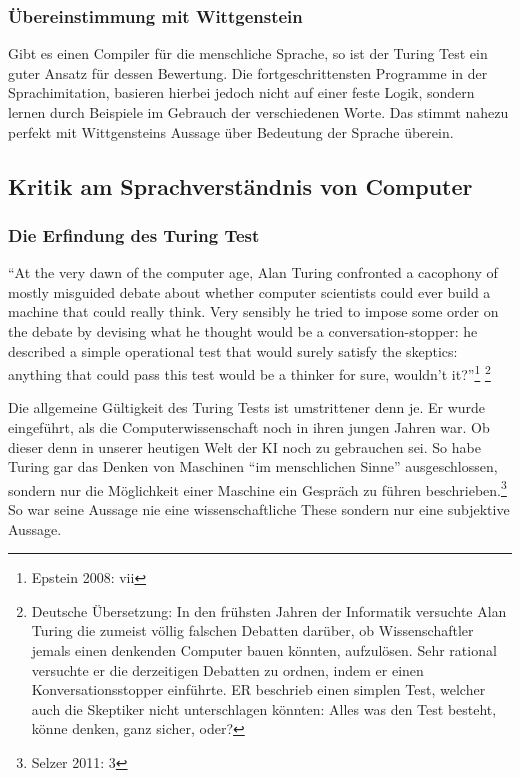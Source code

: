 \documentclass[10pt,a4paper]{article}
\begin{document}
\subsubsection{Übereinstimmung mit Wittgenstein}
Gibt es einen Compiler für die menschliche Sprache, so ist der Turing Test ein guter Ansatz für dessen Bewertung. Die fortgeschrittensten Programme in der Sprachimitation, basieren hierbei jedoch nicht auf einer feste Logik, sondern lernen durch Beispiele im Gebrauch der verschiedenen Worte. Das stimmt nahezu perfekt mit Wittgensteins Aussage über Bedeutung der Sprache überein.

\subsection{Kritik am Sprachverständnis von Computer}
\subsubsection{Die Erfindung des Turing Test}
\begin{displayquote}
\enquote{At the very dawn of the computer age, Alan Turing confronted a cacophony of
mostly misguided debate about whether computer scientists could ever build a
machine that could really think. Very sensibly he tried to impose some order on the
debate by devising what he thought would be a conversation-stopper: he described
a simple operational test that would surely satisfy the skeptics: anything that could
pass this test would be a thinker for sure, wouldn’t it?}\footnote{Epstein 2008: vii} \footnote{Deutsche Übersetzung: In den frühsten Jahren der Informatik versuchte Alan Turing die zumeist völlig falschen Debatten darüber, ob Wissenschaftler jemals einen denkenden Computer bauen könnten, aufzulösen. Sehr rational versuchte er die derzeitigen Debatten zu ordnen, indem er einen Konversationsstopper einführte. ER beschrieb einen simplen Test, welcher auch die Skeptiker nicht unterschlagen könnten: Alles was den Test besteht, könne denken, ganz sicher, oder?}
\end{displayquote}
Die allgemeine Gültigkeit des Turing Tests ist umstrittener denn  je. Er wurde eingeführt, als die Computerwissenschaft noch in ihren jungen Jahren war. Ob dieser denn in unserer heutigen Welt der KI noch zu gebrauchen sei. So habe Turing gar das Denken von Maschinen \enquote{im menschlichen Sinne} ausgeschlossen, sondern nur die Möglichkeit einer Maschine ein Gespräch zu führen beschrieben.\footnote{Selzer 2011: 3} \\
So war seine Aussage nie eine wissenschaftliche These sondern nur eine subjektive Aussage.
\end{document}
